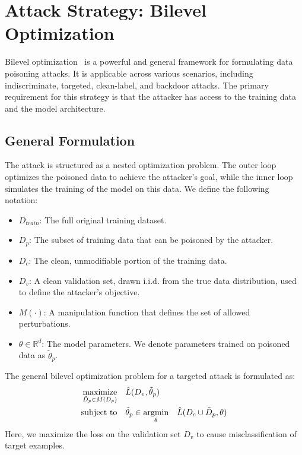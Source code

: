 \documentclass[11pt]{report}
\begin{document}

\maketitle


\section{Attack Strategy: Bilevel Optimization}

Bilevel optimization ~\cite{zhang2023introduction}is a powerful and general framework for formulating data poisoning attacks. It is applicable across various scenarios, including indiscriminate, targeted, clean-label, and backdoor attacks. The primary requirement for this strategy is that the attacker has access to the training data and the model architecture.

\subsection{General Formulation}
The attack is structured as a nested optimization problem. The outer loop optimizes the poisoned data to achieve the attacker's goal, while the inner loop simulates the training of the model on this data. We define the following notation:
\begin{itemize}
    \item $D_{train}$: The full original training dataset.
    \item $D_p$: The subset of training data that can be poisoned by the attacker.
    \item $D_c$: The clean, unmodifiable portion of the training data.
    \item $D_v$: A clean validation set, drawn i.i.d. from the true data distribution, used to define the attacker's objective.
    \item $M(\cdot)$: A manipulation function that defines the set of allowed perturbations.
    \item $\theta \in \mathbb{R}^d$: The model parameters. We denote parameters trained on poisoned data as $\tilde{\theta}_p$.
\end{itemize}
The general bilevel optimization problem for a targeted attack is formulated as:
\begin{align}
    \underset{\tilde{D}_p \in M(D_p)}{\text{maximize}} &\quad \hat{L}(D_v, \tilde{\theta}_p) \label{eq:outer_problem} \\
    \operatorname{subject\,\,to} &\quad \tilde{\theta}_p \in \underset{\theta}{\text{argmin}} \quad \hat{L}(D_c \cup \tilde{D}_p, \theta) \label{eq:inner_problem}
\end{align}
Here, we maximize the loss on the validation set $D_v$ to cause misclassification of target examples.
\end{document}
